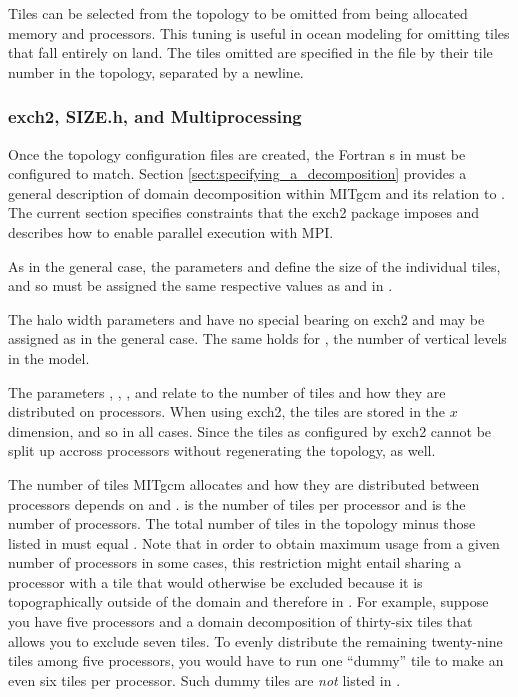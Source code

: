 Tiles can be selected from the topology to be omitted from being
allocated memory and processors.  This tuning is useful in ocean
modeling for omitting tiles that fall entirely on land.  The tiles
omitted are specified in the file
by their tile number in the topology, separated by a newline. \\




\subsubsection{exch2, SIZE.h, and Multiprocessing}
\label{sec:exch2mpi}

Once the topology configuration files are created, the Fortran
s in  must be configured to match.
Section \ref{sect:specifying_a_decomposition}  provides a general description of domain
decomposition within MITgcm and its relation to . The
current section specifies constraints that the exch2 package imposes
and describes how to enable parallel execution with MPI.

As in the general case, the parameters  and
 define the size of the individual tiles, and so
must be assigned the same respective values as  and
 in .

The halo width parameters  and 
have no special bearing on exch2 and may be assigned as in the general
case. The same holds for , the number of vertical
levels in the model.

The parameters , ,
, and  relate to the number of
tiles and how they are distributed on processors.  When using exch2,
the tiles are stored in the $x$ dimension, and so
 in all cases.  Since the tiles as
configured by exch2 cannot be split up accross processors without
regenerating the topology,  as well.

The number of tiles MITgcm allocates and how they are distributed
between processors depends on  and
.   is the number of tiles per
processor and  is the number of processors.  The
total number of tiles in the topology minus those listed in
 must equal .  Note that in order to
obtain maximum usage from a given number of processors in some cases,
this restriction might entail sharing a processor with a tile that
would otherwise be excluded because it is topographically outside of
the domain and therefore in .  For example,
suppose you have five processors and a domain decomposition of
thirty-six tiles that allows you to exclude seven tiles.  To evenly
distribute the remaining twenty-nine tiles among five processors, you
would have to run one ``dummy'' tile to make an even six tiles per
processor.  Such dummy tiles are \emph{not} listed in
.

